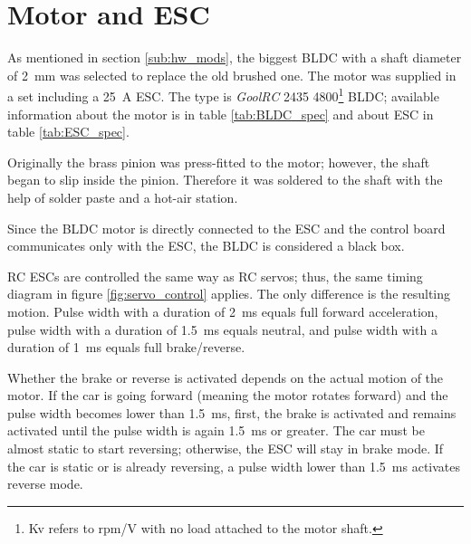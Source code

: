 \section{Motor and ESC}
\label{sec:hw_bldc}
As mentioned in section \ref{sub:hw_mods}, the biggest BLDC with a shaft diameter of \SI{2}{\mm} was selected to replace the old brushed one. The motor was supplied in a set including a \SI{25}{\A} ESC. The type is \textit{GoolRC} 2435 \SI{4800}{\Kv}\footnote{\unit{Kv} refers to rpm/V with no load attached to the motor shaft.} BLDC; available information about the motor is in table \ref{tab:BLDC_spec} and about ESC in table \ref{tab:ESC_spec}.

Originally the brass pinion was press-fitted to the motor; however, the shaft began to slip inside the pinion. Therefore it was soldered to the shaft with the help of solder paste and a hot-air station.

Since the BLDC motor is directly connected to the ESC and the control board communicates only with the ESC, the BLDC is considered a black box.

RC ESCs are controlled the same way as RC servos; thus, the same timing diagram in figure \ref{fig:servo_control} applies. The only difference is the resulting motion. Pulse width with a duration of \SI{2}{\ms} equals full forward acceleration, pulse width with a duration of \SI{1.5}{\ms} equals neutral, and pulse width with a duration of \SI{1}{\ms} equals full brake/reverse.

Whether the brake or reverse is activated depends on the actual motion of the motor. If the car is going forward (meaning the motor rotates forward) and the pulse width becomes lower than \SI{1.5}{\ms}, first, the brake is activated and remains activated until the pulse width is again \SI{1.5}{\ms} or greater. The car must be almost static to start reversing; otherwise, the ESC will stay in brake mode. If the car is static or is already reversing, a pulse width lower than \SI{1.5}{\ms} activates reverse mode.

